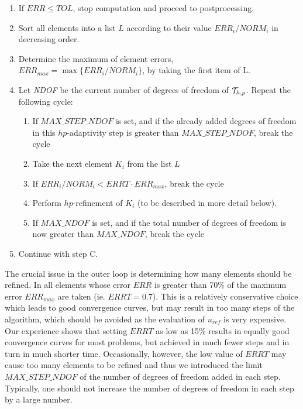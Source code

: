 \begin{enumerate}
\item If $ERR \le TOL$, stop computation and proceed to postprocessing.

\item Sort all elements into a list $L$ according to their value $ERR_i / NORM_i$
      in decreasing order.
      
\item Determine the maximum of element errors, $ERR_{max} = \max\{ERR_i / NORM_i\}$,
      by taking the first item of L.
      
\item Let {\it NDOF} be the current number of degrees of freedom of ${\cal{T}}_{h,p}$. Repeat the following cycle:
      \begin{enumerate}
			\item If $MAX\_STEP\_NDOF$ is set, and if the already added degrees of freedom in this $hp$-adaptivity step is greater than $MAX\_STEP\_NDOF$, break the cycle
      	\item Take the next element $K_i$ from the list $L$
      	\item If $ERR_i / NORM_i < ERRT \cdot ERR_{max}$, break the cycle
      	\item Perform $hp$-refinement of $K_i$ (to be described in more detail below).
      	\item If $MAX\_NDOF$ is set, and if the total number of degrees of freedom is now greater than $MAX\_NDOF$, break
      	the cycle
      \end{enumerate}
      
\item Continue with step C.\\
\end{enumerate}

The crucial issue in the outer loop is determining how many elements should be refined.
In \cite{derade} all elements whose error $ERR$ is greater than 70\% of the maximum
error $ERR_{max}$ are taken (ie. $ERRT = 0.7$). This is a relatively conservative
choice which leads to good convergence curves, but may result in too many steps
of the algorithm, which should be avoided as the evaluation of $u_{ref}$ is very
expensive. Our experience shows that setting $ERRT$ as low as 15\% results
in equally good convergence curves for most problems, but achieved in much fewer
steps and in turn in much shorter time. Occasionally, however, the low value of
$ERRT$ may cause too many elements to be refined and thus we introduced the 
limit $MAX\_STEP\_NDOF$ of the number of degrees of freedom added in each step. Typically,
one should not increase the number of degrees of freedom in each step by a large number.

